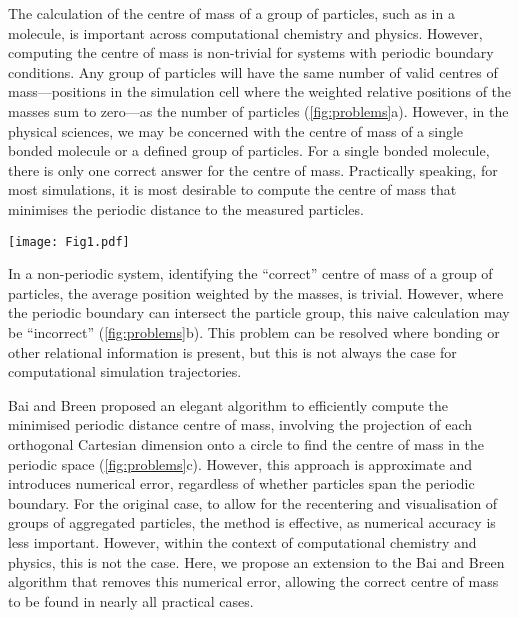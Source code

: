 \documentclass[reprint,superscriptaddress,nobibnotes,amsmath,amssymb,aip]{revtex4-2}
\begin{document}
The calculation of the centre of mass of a group of particles, such as in a molecule, is important across computational chemistry and physics.\cite{zhang_chemically_2024,happel_coordinated_2024,maggi_universality_2021,grillo_molecular_2023,bullerjahn_unwrapping_2023,jaeger-honz_systematic_2024}
However, computing the centre of mass is non-trivial for systems with periodic boundary conditions. 
Any group of particles will have the same number of valid centres of mass---positions in the simulation cell where the weighted relative positions of the masses sum to zero---as the number of particles (\cref{fig:problems}a). 
However, in the physical sciences, we may be concerned with the centre of mass of a single bonded molecule or a defined group of particles. 
For a single bonded molecule, there is only one correct answer for the centre of mass.
Practically speaking, for most simulations, it is most desirable to compute the centre of mass that minimises the periodic distance to the measured particles.
%
\begin{figure*}
  \texttt{[image: Fig1.pdf]}
  \caption{
  (a) Demonstration of the $N$ possible centres of mass in an $N$ particle system, where two periodic cells are visible, and the dashed line indicates the particle grouping that leads to a given centre of mass (cross). 
  (b) The problem with the naive centre of mass (red cross) calculation in periodic systems, where the particle group spans a periodic boundary. 
  (c) The projection of the particles in the bottom diagram of (b) onto a circle to find the centre of mass, which minimises the weighted distance to all particles.}
  \label{fig:problems}
\end{figure*}
%

In a non-periodic system, identifying the ``correct'' centre of mass of a group of particles, the average position weighted by the masses, is trivial. 
However, where the periodic boundary can intersect the particle group, this naive calculation may be ``incorrect'' (\cref{fig:problems}b). 
This problem can be resolved where bonding or other relational information is present, but this is not always the case for computational simulation trajectories. 

Bai and Breen proposed an elegant algorithm to efficiently compute the minimised periodic distance centre of mass,\cite{bai_calculating_2008} involving the projection of each orthogonal Cartesian dimension onto a circle to find the centre of mass in the periodic space (\cref{fig:problems}c). 
However, this approach is approximate and introduces numerical error, regardless of whether particles span the periodic boundary. 
For the original case, to allow for the recentering and visualisation of groups of aggregated particles, the method is effective, as numerical accuracy is less important. 
However, within the context of computational chemistry and physics, this is not the case.  
Here, we propose an extension to the Bai and Breen algorithm that removes this numerical error, allowing the correct centre of mass to be found in nearly all practical cases. 
\end{document}

